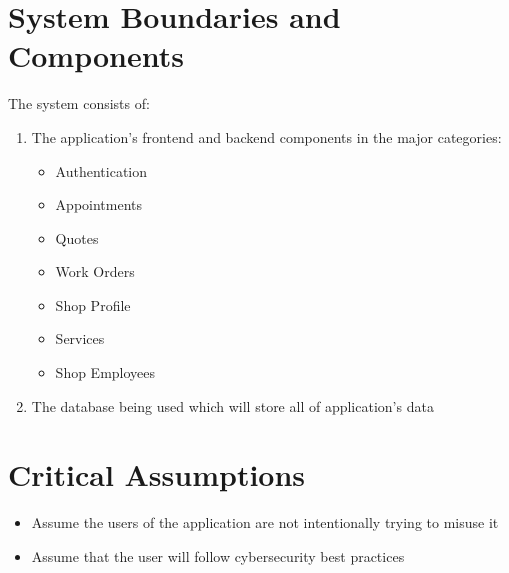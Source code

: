 \documentclass{article}
\begin{document}
\section{System Boundaries and Components}
The system consists of:
\begin{enumerate}
	\item The application's frontend and backend components in the major categories:
	      \begin{itemize}
		      \item Authentication
		      \item Appointments
		      \item Quotes
		      \item Work Orders
		      \item Shop Profile
		      \item Services
		      \item Shop Employees
	      \end{itemize}
	\item The database being used which will store all of application's data
\end{enumerate}

\section{Critical Assumptions}
\begin{itemize}
	\item Assume the users of the application are not intentionally trying to misuse it
	\item Assume that the user will follow cybersecurity best practices
\end{itemize}
\end{document}
